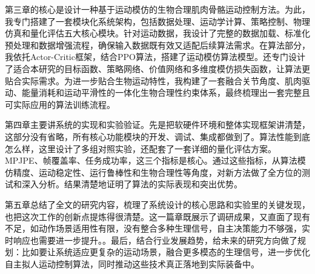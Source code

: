 第三章的核心是设计一种基于运动模仿的生物合理肌肉骨骼运动控制方法。为此，我专门搭建了一套模块化系统架构，包括数据处理、运动学计算、策略控制、物理仿真和量化评估五大核心模块。针对运动数据，我设计了完整的数据加载、标准化预处理和数据增强流程，确保输入数据既有效又适配后续算法需求。在算法部分，我依托Actor-Critic框架，结合PPO算法，搭建了运动模仿算法模型。还专门设计了适合本研究的目标函数、策略网络、价值网络和多维度模仿损失函数，让算法更贴合实际需求。为进一步贴合生物运动特性，我构建了一套融合关节角度、肌肉驱动、能量消耗和运动平滑性的一体化生物合理性约束体系，最终梳理出一套完整且可实际应用的算法训练流程。

第四章主要讲系统的实现和实验验证。先是把软硬件环境和整体实现框架讲清楚，这部分没有省略，所有核心功能模块的开发、调试、集成都做到了。算法性能到底怎么样，这里设计了多组对照实验，还配套了一套详细的量化评估方案。MPJPE、帧覆盖率、任务成功率，这三个指标是核心。通过这些指标，从算法模仿精度、运动稳定性、运行鲁棒性和生物合理性等角度，对新方法做了全方位的测试和深入分析。结果清楚地证明了算法的实际表现和突出优势。

第五章总结了全文的研究内容，梳理了系统设计的核心思路和实验里的关键发现，也把这次工作的创新点提炼得很清楚。这一篇章既展示了调研成果，又直面了现有不足，如动作场景适用性有限，没有整合多种生理信号，自主决策能力不够强，实时响应也需要进一步提升。。最后，结合行业发展趋势，给未来的研究方向做了规划：比如要让系统适应更复杂的运动场景，融合更多模态的生理信号，进一步优化自主拟人运动控制算法，同时推动这些技术真正落地到实际装备中。
